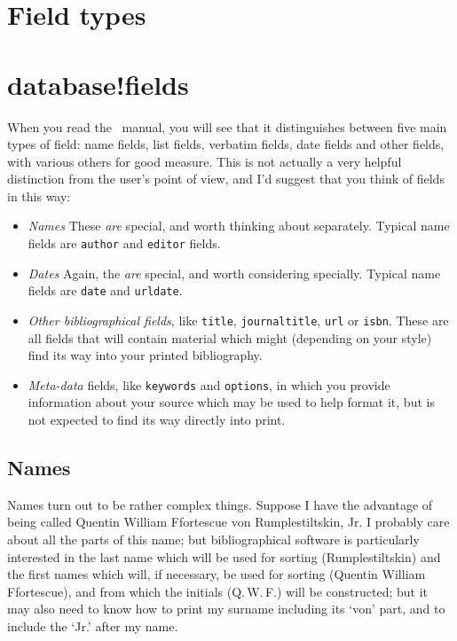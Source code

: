 \section{Field types}

\section{database!fields}
When you read the \biblatex\ manual,
you will see that it distinguishes between five main types of field:
name fields, list fields, verbatim fields, date fields and other
fields, with various others for good measure. This is not actually a
very helpful distinction from the user's point of view, and I'd
suggest that you think of fields in this way:
\begin{itemize}
\item \emph{Names} These \emph{are} special, and worth thinking about
  separately. Typical name fields are \texttt{author} and
  \texttt{editor} fields.
\item \emph{Dates} Again, the \emph{are} special, and worth
  considering specially. Typical name fields are \texttt{date} and
  \texttt{urldate}.
\item \emph{Other bibliographical fields}, like \texttt{title},
  \texttt{journaltitle}, \texttt{url} or \texttt{isbn}. These are all
  fields that will contain material which might (depending on your
  style) find its way into your printed bibliography.
\item \emph{Meta-data} fields, like \texttt{keywords} and
  \texttt{options}, in which you provide information about your source
  which may be used to help format it, but is not expected to find its
  way directly into print.
\end{itemize} 

\subsection{Names}

Names turn out to be rather complex things. Suppose I have the
advantage of being called Quentin William Ffortescue von
Rumplestiltskin, Jr. I probably care about all the parts of this name;
but bibliographical software is particularly interested in the last
name which will be used for sorting (Rumplestiltskin) and the first
names which will, if necessary, be used for sorting (Quentin William
Ffortescue), and from which the initials (Q.\,W.\,F.) will be
constructed; but it may also need to know how to print my surname
including its `von' part, and to include the `Jr.' after my name.

